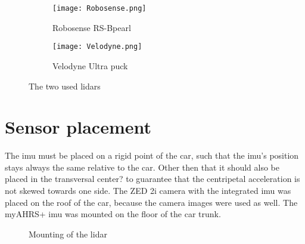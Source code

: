 \begin{figure}[htb]
	\centering
	\begin{subfigure}{0.3\textwidth}
		\centering
		\texttt{[image: Robosense.png]}
		\caption{Robosense RS-Bpearl \cite{RoboSense2020}}
		\label{fig:lidar_robosense}
	\end{subfigure}
	\begin{subfigure}{0.3\textwidth}
		\centering
		\texttt{[image: Velodyne.png]}
		\caption{Velodyne Ultra puck \cite{Velodyne2018}}
		\label{fig:lidar_velodyne}
	\end{subfigure}
	\caption{The two used \gls{lidar}s}
	\label{fig:lidars_used}
\end{figure}



\section{Sensor placement}
The \gls{imu} must be placed on a rigid point of the car, such that the \gls{imu}'s position stays always the same relative to the car.
Other then that it should also be placed in the transversal center? to guarantee that the centripetal acceleration is not skewed towards one side.
The ZED 2i camera with the integrated \gls{imu} was placed on the roof of the car, because the camera images were used as well.
The myAHRS+ \gls{imu} was mounted on the floor of the car trunk.\\
\begin{figure}[htpb]
	\centering
	
	\caption{Mounting of the \acrshort{lidar}}
	\label{fig:tikz_lidar_mount}
\end{figure}
